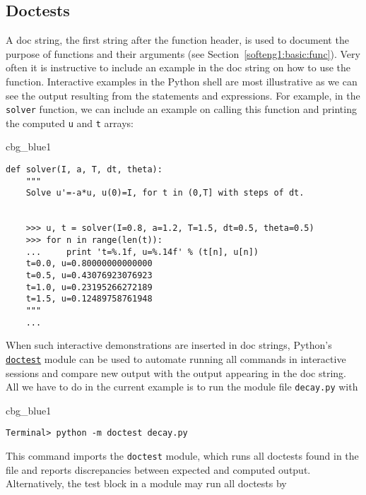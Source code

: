 \documentclass[graybox,sectrefs,envcountresetchap,open=right,final]{svmonodo}
\newenvironment{_cod_tight}[1]{
   \def\FrameCommand{\colorbox{#1}}
   \FrameRule0.6pt\MakeFramed {\FrameRestore}\vskip3mm}
   {\vskip0mm\endMakeFramed}
\newenvironment{cod}[1]{
\bgroup\rmfamily
\fboxsep=0mm\relax
\begin{_cod_tight}{#1}
\list{}{\parsep=-2mm\parskip=0mm\topsep=0pt\leftmargin=2mm
\rightmargin=2\leftmargin\leftmargin=4pt\relax}
\item\relax}
{\endlist\end{_cod_tight}\egroup}
\begin{document}
\subsection{Doctests}


A doc string, the first string after the function header, is used to
document the purpose of functions and their arguments
(see Section~\ref{softeng1:basic:func}). Very often it
is instructive to include an example in the doc string
on how to use the function.
Interactive examples in the Python shell are most illustrative as
we can see the output resulting from the statements and expressions.
For example,
in the \texttt{solver} function, we can include an example on calling
this function and printing the computed \texttt{u} and \texttt{t} arrays:

\begin{cod}{cbg_blue1}\begin{Verbatim}[numbers=none,fontsize=\fontsize{9pt}{9pt},baselinestretch=0.95,xleftmargin=2mm]
def solver(I, a, T, dt, theta):
    """
    Solve u'=-a*u, u(0)=I, for t in (0,T] with steps of dt.


    >>> u, t = solver(I=0.8, a=1.2, T=1.5, dt=0.5, theta=0.5)
    >>> for n in range(len(t)):
    ...     print 't=%.1f, u=%.14f' % (t[n], u[n])
    t=0.0, u=0.80000000000000
    t=0.5, u=0.43076923076923
    t=1.0, u=0.23195266272189
    t=1.5, u=0.12489758761948
    """
    ...
\end{Verbatim}
\end{cod}
\noindent

When such interactive demonstrations are inserted in doc strings,
Python's \href{{http://docs.python.org/library/doctest.html}}{\nolinkurl{doctest}}
module can be used to automate running all commands
in interactive sessions and compare new output with the output
appearing in the doc string.  All we have to do in the current example
is to run the module file \texttt{decay.py} with

\begin{cod}{cbg_blue1}\begin{Verbatim}[numbers=none,fontsize=\fontsize{9pt}{9pt},baselinestretch=0.95,xleftmargin=2mm]
Terminal> python -m doctest decay.py
\end{Verbatim}
\end{cod}
\noindent
This command imports the \texttt{doctest} module, which runs all
doctests found in the file and reports discrepancies between
expected and computed output.
Alternatively, the test block in a module may run all doctests
by
\end{document}
